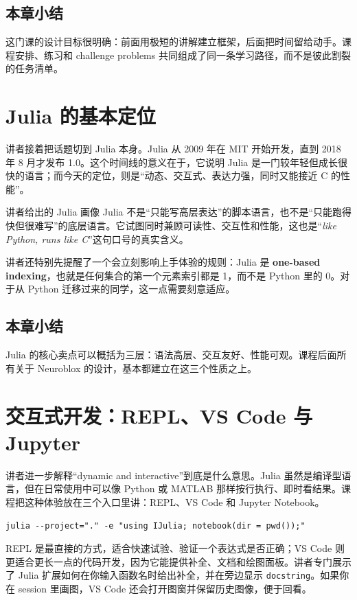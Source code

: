 \documentclass[a4paper]{article}
\begin{document}
\subsection{本章小结}
这门课的设计目标很明确：前面用极短的讲解建立框架，后面把时间留给动手。课程安排、练习和 challenge problems 共同组成了同一条学习路径，而不是彼此割裂的任务清单。

\section{Julia 的基本定位}
讲者接着把话题切到 Julia 本身。Julia 从 2009 年在 MIT 开始开发，直到 2018 年 8 月才发布 1.0。这个时间线的意义在于，它说明 Julia 是一门较年轻但成长很快的语言；而今天的定位，则是“动态、交互式、表达力强，同时又能接近 C 的性能”。

\begin{importantbox}{讲者给出的 Julia 画像}
Julia 不是“只能写高层表达”的脚本语言，也不是“只能跑得快但很难写”的底层语言。它试图同时兼顾可读性、交互性和性能，这也是“\emph{like Python, runs like C}”这句口号的真实含义。
\end{importantbox}

讲者还特别先提醒了一个会立刻影响上手体验的规则：Julia 是 \textbf{one-based indexing}，也就是任何集合的第一个元素索引都是 1，而不是 Python 里的 0。对于从 Python 迁移过来的同学，这一点需要刻意适应。

\subsection{本章小结}
Julia 的核心卖点可以概括为三层：语法高层、交互友好、性能可观。课程后面所有关于 Neuroblox 的设计，基本都建立在这三个性质之上。

\section{交互式开发：REPL、VS Code 与 Jupyter}
讲者进一步解释“dynamic and interactive”到底是什么意思。Julia 虽然是编译型语言，但在日常使用中可以像 Python 或 MATLAB 那样按行执行、即时看结果。课程把这种体验放在三个入口里讲：REPL、VS Code 和 Jupyter Notebook。

\begin{lstlisting}
julia --project="." -e "using IJulia; notebook(dir = pwd());"
\end{lstlisting}

REPL 是最直接的方式，适合快速试验、验证一个表达式是否正确；VS Code 则更适合更长一点的代码开发，因为它能提供补全、文档和绘图面板。讲者专门展示了 Julia 扩展如何在你输入函数名时给出补全，并在旁边显示 \texttt{docstring}。如果你在 session 里画图，VS Code 还会打开图窗并保留历史图像，便于回看。
\end{document}
